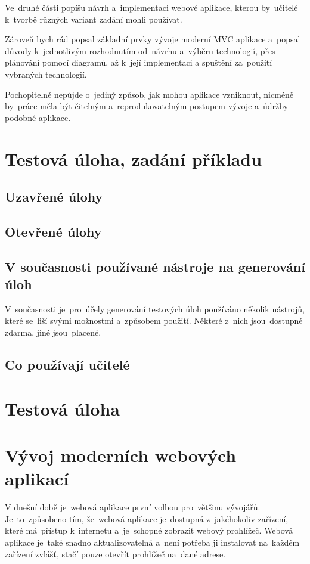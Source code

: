 \documentclass[14pt,a4paper]{article}
\begin{document}
    Ve~druhé části popíšu návrh a~implementaci webové aplikace, kterou by~učitelé k~tvorbě různých variant zadání mohli používat.
    
    Zároveň bych rád popsal základní prvky vývoje moderní \textsc{MVC} aplikace a~popsal důvody k~jednotlivým rozhodnutím od~návrhu
    a~výběru technologií, přes plánování pomocí diagramů, až k~její implementaci a spuštění za~použití vybraných technologií.
    
    Pochopitelně nepůjde o~jediný způsob, jak mohou aplikace vzniknout, nicméně by~práce měla být čitelným a~reprodukovatelným postupem vývoje
    a~údržby podobné aplikace.

    \section{Testová úloha, zadání příkladu}

        \subsection{Uzavřené úlohy}

        \subsection{Otevřené úlohy}
        
        \subsection{V současnosti používané nástroje na generování úloh}
        V~současnosti je~pro~účely generování testových úloh používáno několik nástrojů, které se~liší svými možnostmi a~způsobem použití.
        Některé z~nich jsou~dostupné zdarma, jiné jsou~placené.
        
        \subsection{Co používají učitelé}

    \section{Testová úloha}

    \section{Vývoj moderních webových aplikací}
    V dnešní době je~webová aplikace první volbou pro~většinu vývojářů. Je~to~způsobeno tím, že~webová aplikace je~dostupná z~jakéhokoliv zařízení, které má~přístup k~internetu a~je~schopné zobrazit webový prohlížeč. Webová aplikace je~také snadno aktualizovatelná a~není potřeba ji instalovat na~každém zařízení zvlášť, stačí pouze otevřít prohlížeč na~dané adrese.
    
\end{document}
